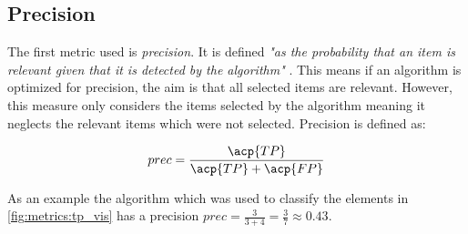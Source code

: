 \subsection{Precision}
\label{chp:fundamentals:sec:metrics:subsec:precision}

The first metric used is \textit{precision}.
It is defined \textit{"as the probability that an item is relevant given that it is detected by the algorithm"} \parencite{Zhu:2004}.
This means if an algorithm is optimized for precision, the aim is that all selected items are relevant.
However, this measure only considers the items selected by the algorithm meaning it neglects the relevant items which were not selected.
Precision is defined as:

\begin{equation}\label{eq:precision}
    prec = \frac{\acp{TP}}{\acp{TP}+\acp{FP}}
\end{equation}

As an example the algorithm which was used to classify the elements in \cref{fig:metrics:tp_vis} has a precision $prec = \frac{3}{3+4} = \frac{3}{7}\approx 0.43$.
